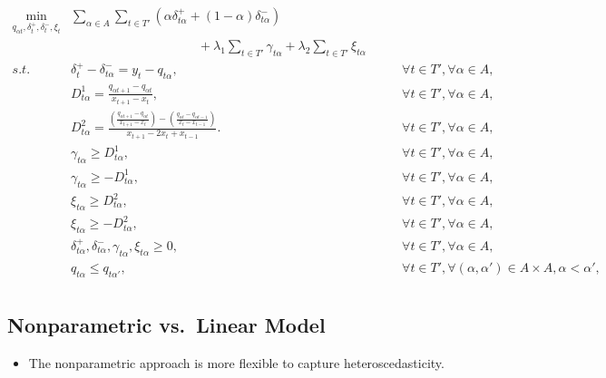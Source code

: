 \begin{eqnarray}
\min_{q_{\alpha t},\delta^+_{t}, \delta_t^-, \xi_t} & \sum_{\alpha \in A} \sum_{t \in T'}\left(\alpha\delta_{t \alpha }^{+}+(1-\alpha)\delta_{t \alpha }^{-}\right) & \\
& \qquad \qquad \qquad \qquad \qquad + \lambda_1\sum_{t \in T'}\gamma_{t \alpha } + \lambda_2\sum_{t \in T'}\xi_{t \alpha } & \nonumber \\
s.t. & \delta_{t}^{+}-\delta_{t \alpha }^{-}=y_{t}-q_{t \alpha }, & \qquad\forall t \in T',\forall \alpha \in A,\\
   & D^{1}_{t \alpha }=\frac{q_{\alpha t+1}-q_{\alpha t}}{x_{t+1}-x_{t}},
    & \qquad\forall t \in T',\forall \alpha \in A,\\   
 & D^{2}_{t \alpha }=\frac{\left(\frac{q_{\alpha t+1}-q_{\alpha t}}{x_{t+1}-x_{t}}\right)-\left(\frac{q_{\alpha t}-q_{\alpha t-1}}{x_{t}-x_{t-1}}\right)}{x_{t+1}-2x_{t} + x_{t-1}}.
  & \qquad\forall t \in T',\forall \alpha \in A,\\
 & \gamma_{t \alpha}\geq D^1_{t \alpha }, & \qquad\forall t \in T',\forall \alpha \in A,\\
  & \gamma_{t \alpha}\geq-D^1_{t \alpha}, & \qquad\forall t \in T',\forall \alpha \in A,\\
  & \xi_{t \alpha}\geq D^2_{t \alpha }, & \qquad\forall t \in T',\forall \alpha \in A,\\
 & \xi_{t \alpha}\geq-D^2_{t \alpha}, & \qquad\forall t \in T',\forall \alpha \in A,\\
 & \delta_{t \alpha}^{+},\delta_{t \alpha}^{-},\gamma_{t \alpha}, \xi_{t \alpha}\geq0, & \qquad\forall t \in T',\forall \alpha \in A,\\
  & q_{t \alpha} \leq q_{t \alpha'}, & \qquad \forall t \in T', \forall (\alpha, \alpha') \in A \times A, \alpha < \alpha',\nonumber \\  
  \end{eqnarray}

\subsection{Nonparametric vs.~Linear
Model}\label{nonparametric-vs.linear-model}

\begin{itemize}
\tightlist
\item
  The nonparametric approach is more flexible to capture
  heteroscedasticity.
\end{itemize}

